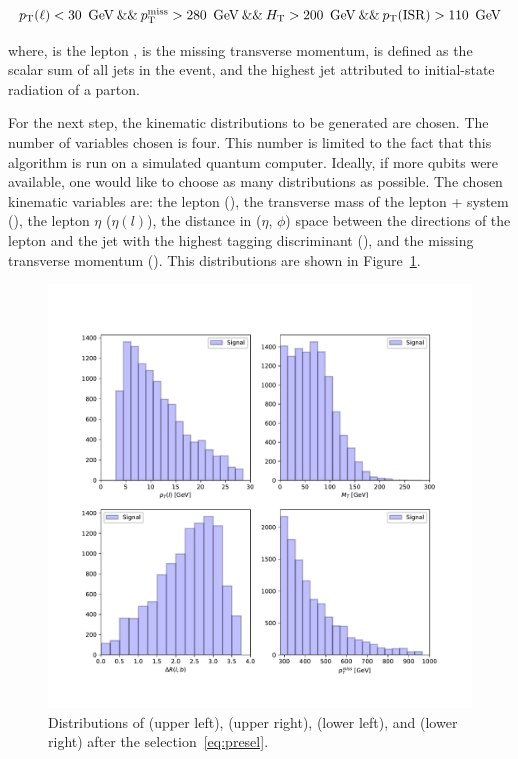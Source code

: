 \begin{linenomath}
\begin{equation}
\resizebox{\hsize}{!}{$\ptl < 30~\GeV\:\&\&\:\ptmiss > 280~\GeV\:\&\&\:\HT > 200~\GeV\:\&\&\:\ptisr>110~\GeV$}
\label{eq:presel}
\end{equation}
\end{linenomath}
where, \ptl is the lepton \pt, \ptmiss is the missing transverse momentum, \HT is
defined as the scalar \pt sum of all jets in the event, and \ptisr the highest 
jet \pt attributed to initial-state radiation of a parton.

For the next step, the kinematic distributions to be generated are chosen. The 
number of variables chosen is four. This number is limited to the fact that this
algorithm is run on a simulated quantum computer. Ideally, if more qubits were
available, one would like to choose as many distributions as possible. The 
chosen kinematic variables are: the lepton \pt (\ptl), the transverse mass of 
the lepton + \ptvecmiss system (\mt), the lepton $\eta$ ($\eta(l)$), the distance 
in ($\eta$, $\phi$) space between the directions of the lepton and the jet with 
the highest \cPqb tagging discriminant (\drLB), and the missing transverse 
momentum (\ptmiss). This distributions are shown in Figure~\ref{fig:features}.

\begin{figure}[!htbp]
\centering
    \includegraphics[width=1\textwidth]{figures/features.pdf}
\caption{Distributions of \ptl (upper left), \mt (upper right), \drLB 
    (lower left), and \ptmiss (lower right) after the selection~\ref{eq:presel}.}
\label{fig:features}
\end{figure}

